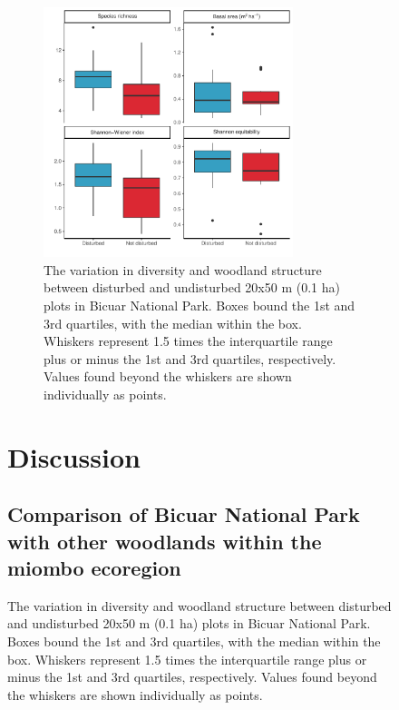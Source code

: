 \documentclass[diversity,article,submit,moreauthors,pdftex]{Definitions/mdpi}
\begin{document}
\begin{figure}[H]
\begin{figure}[H]
\centering
	\includegraphics[width=0.8\textwidth]{img/degrad_box}
	\caption{The variation in diversity and woodland structure between disturbed and undisturbed 20x50 m (0.1 ha) plots in Bicuar National Park. Boxes bound the 1st and 3rd quartiles, with the median within the box. Whiskers represent 1.5 times the interquartile range plus or minus the 1st and 3rd quartiles, respectively. Values found beyond the whiskers are shown individually as points.}
	\label{degrad_box}
\end{figure}


\section{Discussion}

\subsection{Comparison of Bicuar National Park with other woodlands within the miombo ecoregion}


\end{figure}
\end{document}
